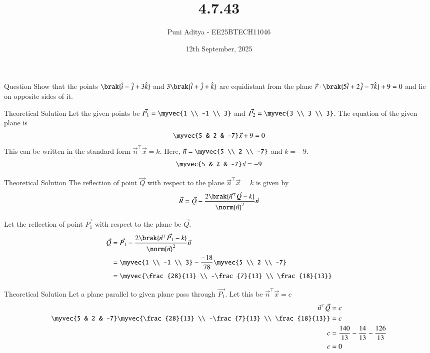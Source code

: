 \documentclass{beamer}
\title{4.7.43}
\date{12th September, 2025}
\author{Puni Aditya - EE25BTECH11046}
\begin{document}
\frame{\titlepage}
\begin{frame}{Question}
Show that the points $\brak{\hat{i}-\hat{j}+3\hat{k}}$ and $3\brak{\hat{i}+\hat{j}+\hat{k}}$ are equidistant from the plane $\vec{r}\cdot\brak{5\hat{i}+2\hat{j}-7\hat{k}} + 9 = 0$ and lie on opposite sides of it.
\end{frame}

\begin{frame}{Theoretical Solution}
Let the given points be $\vec{P_1} = \myvec{1 \\ -1 \\ 3}$ and $\vec{P_2} = \myvec{3 \\ 3 \\ 3}$.
The equation of the given plane is
\begin{align}
    \myvec{5 & 2 & -7}\vec{x} + 9 = 0
\end{align}
This can be written in the standard form $\vec{n}^\top\vec{x} = k$. Here, $\vec{n} = \myvec{5 \\ 2 \\ -7}$ and $k = -9$.
\begin{align}
    \myvec{5 & 2 & -7}\vec{x} = -9 \label{eq:plane_eqn}
\end{align}
\end{frame}

\begin{frame}{Theoretical Solution}
The reflection of point $\vec{Q}$ with respect to the plane $\vec{n}^\top\vec{x}=k$ is given by
\begin{align}
    \vec{R} = \vec{Q} - \frac{2\brak{\vec{n}^\top\vec{Q}-k}}{\norm{\vec{n}}^2}\vec{n}
\end{align}

Let the reflection of point $\vec{P_1}$ with respect to the plane be $\vec{Q}$.
\begin{align}
    \vec{Q} &= \vec{P_1} - \frac{2\brak{\vec{n}^\top\vec{P_1}-k}}{\norm{\vec{n}}^2}\vec{n} \\
    &= \myvec{1 \\ -1 \\ 3} - \frac{-18}{78}\myvec{5 \\ 2 \\ -7} \\
    &= \myvec{\frac{28}{13} \\ -\frac{7}{13} \\ \frac{18}{13}}
\end{align}
\end{frame}

\begin{frame}{Theoretical Solution}
Let a plane parallel to given plane pass through $\vec{P_1}$. Let this be $\vec{n}^\top\vec{x}=c$
\begin{align}
    \vec{n}^\top\vec{Q} &= c \\
    \myvec{5 & 2 & -7}\myvec{\frac{28}{13} \\ -\frac{7}{13} \\ \frac{18}{13}} &= c \\
    c &= \frac{140}{13}-\frac{14}{13}-\frac{126}{13} \\
    c &= 0
\end{align}
\end{frame}
\end{document}
